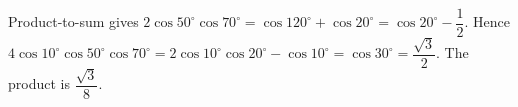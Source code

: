 Product-to-sum gives $2\cos50^\circ\cos70^\circ=\cos120^\circ+\cos20^\circ=\cos20^\circ-\dfrac{1}{2}$. Hence $4\cos10^\circ\cos50^\circ\cos70^\circ=2\cos10^\circ\cos20^\circ-\cos10^\circ=\cos30^\circ=\dfrac{\sqrt3}{2}$. The product is $\boxed{\dfrac{\sqrt3}{8}}$.
